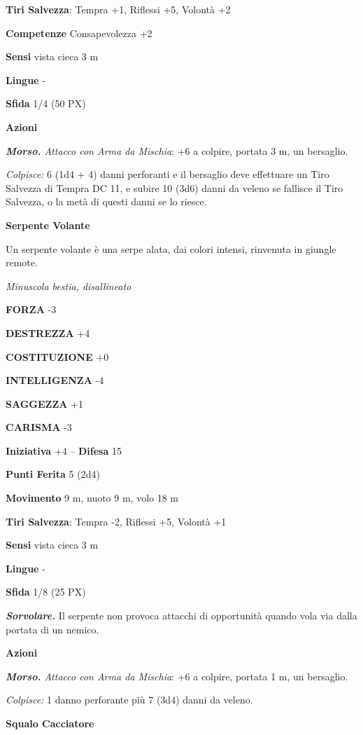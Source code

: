 \begin{multicols}{2}
\textbf{Tiri Salvezza}: Tempra +1, Riflessi +5, Volontà +2

\textbf{Competenze} Consapevolezza +2

\textbf{Sensi} vista cieca 3 m

\textbf{Lingue} -

\textbf{Sfida} 1/4 (50 PX)

\textbf{Azioni}

\textit{\textbf{Morso.} Attacco con Arma da Mischia}: +6 a colpire, portata 3 m, un bersaglio.

\textit{Colpisce:} 6 (1d4 + 4) danni perforanti e il bersaglio deve effettuare un Tiro Salvezza di Tempra DC 11, e subire 10 (3d6) danni da veleno se fallisce il Tiro Salvezza, o la metà di questi danni se lo riesce.

\medskip\textbf{Serpente Volante}

Un serpente volante è una serpe alata, dai colori intensi, rinvenuta in giungle remote.

\textit{Minuscola bestia, disallineato}

\textbf{FORZA} -3

\textbf{DESTREZZA} +4

\textbf{COSTITUZIONE} +0

\textbf{INTELLIGENZA} -4

\textbf{SAGGEZZA} +1

\textbf{CARISMA} -3

\textbf{Iniziativa} +4 -- \textbf{Difesa} 15

\textbf{Punti Ferita} 5 (2d4)

\textbf{Movimento} 9 m, nuoto 9 m, volo 18 m

\textbf{Tiri Salvezza}: Tempra -2, Riflessi +5, Volontà +1

\textbf{Sensi} vista cieca 3 m

\textbf{Lingue} -

\textbf{Sfida} 1/8 (25 PX)

\textit{\textbf{Sorvolare.}} Il serpente non provoca attacchi di opportunità quando vola via dalla portata di un nemico.

\textbf{Azioni}

\textit{\textbf{Morso.} Attacco con Arma da Mischia}: +6 a colpire, portata 1 m, un bersaglio.

\textit{Colpisce:} 1 danno perforante più 7 (3d4) danni da veleno.

\medskip\textbf{Squalo Cacciatore}


\end{multicols}
